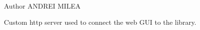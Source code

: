 \begin{DoxyAuthor}{Author}
A\-N\-D\-R\-E\-I M\-I\-L\-E\-A
\end{DoxyAuthor}
Custom http server used to connect the web G\-U\-I to the library. 